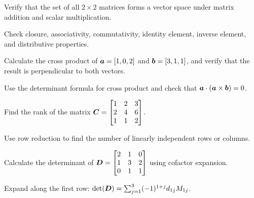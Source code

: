 \begin{exercisebox}[easy]
\begin{problem}
Verify that the set of all $2 \times 2$ matrices forms a vector space under matrix addition and scalar multiplication.
\end{problem}
\begin{hintbox}
Check closure, associativity, commutativity, identity element, inverse element, and distributive properties.
\end{hintbox}
\end{exercisebox}


\begin{exercisebox}[easy]
\begin{problem}
Calculate the cross product of $\boldsymbol{a} = [1, 0, 2]$ and $\boldsymbol{b} = [3, 1, 1]$, and verify that the result is perpendicular to both vectors.
\end{problem}
\begin{hintbox}
Use the determinant formula for cross product and check that $\boldsymbol{a} \cdot (\boldsymbol{a} \times \boldsymbol{b}) = 0$.
\end{hintbox}
\end{exercisebox}


\begin{exercisebox}[easy]
\begin{problem}
Find the rank of the matrix $\boldsymbol{C} = \begin{bmatrix} 1 & 2 & 3 \\ 2 & 4 & 6 \\ 1 & 1 & 2 \end{bmatrix}$.
\end{problem}
\begin{hintbox}
Use row reduction to find the number of linearly independent rows or columns.
\end{hintbox}
\end{exercisebox}


\begin{exercisebox}[easy]
\begin{problem}
Calculate the determinant of $\boldsymbol{D} = \begin{bmatrix} 2 & 1 & 0 \\ 1 & 3 & 2 \\ 0 & 1 & 1 \end{bmatrix}$ using cofactor expansion.
\end{problem}
\begin{hintbox}
Expand along the first row: $\det(\boldsymbol{D}) = \sum_{j=1}^{3} (-1)^{1+j} d_{1j} M_{1j}$.
\end{hintbox}
\end{exercisebox}


